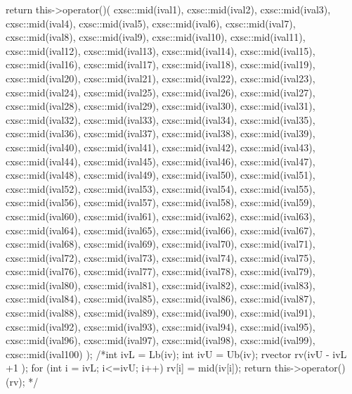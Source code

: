 \begin{DoxyCode}
{
  return this->operator()(
    cxsc::mid(ival1),
    cxsc::mid(ival2),
    cxsc::mid(ival3),
    cxsc::mid(ival4),
    cxsc::mid(ival5),
    cxsc::mid(ival6),
    cxsc::mid(ival7),
    cxsc::mid(ival8),
    cxsc::mid(ival9),
    cxsc::mid(ival10),
    cxsc::mid(ival11),
    cxsc::mid(ival12),
    cxsc::mid(ival13),
    cxsc::mid(ival14),
    cxsc::mid(ival15),
    cxsc::mid(ival16),
    cxsc::mid(ival17),
    cxsc::mid(ival18),
    cxsc::mid(ival19),
    cxsc::mid(ival20),
    cxsc::mid(ival21),
    cxsc::mid(ival22),
    cxsc::mid(ival23),
    cxsc::mid(ival24),
    cxsc::mid(ival25),
    cxsc::mid(ival26),
    cxsc::mid(ival27),
    cxsc::mid(ival28),
    cxsc::mid(ival29),
    cxsc::mid(ival30),
    cxsc::mid(ival31),
    cxsc::mid(ival32),
    cxsc::mid(ival33),
    cxsc::mid(ival34),
    cxsc::mid(ival35),
    cxsc::mid(ival36),
    cxsc::mid(ival37),
    cxsc::mid(ival38),
    cxsc::mid(ival39),
    cxsc::mid(ival40),
    cxsc::mid(ival41),
    cxsc::mid(ival42),
    cxsc::mid(ival43),
    cxsc::mid(ival44),
    cxsc::mid(ival45),
    cxsc::mid(ival46),
    cxsc::mid(ival47),
    cxsc::mid(ival48),
    cxsc::mid(ival49),
    cxsc::mid(ival50),
    cxsc::mid(ival51),
    cxsc::mid(ival52),
    cxsc::mid(ival53),
    cxsc::mid(ival54),
    cxsc::mid(ival55),
    cxsc::mid(ival56),
    cxsc::mid(ival57),
    cxsc::mid(ival58),
    cxsc::mid(ival59),
    cxsc::mid(ival60),
    cxsc::mid(ival61),
    cxsc::mid(ival62),
    cxsc::mid(ival63),
    cxsc::mid(ival64),
    cxsc::mid(ival65),
    cxsc::mid(ival66),
    cxsc::mid(ival67),
    cxsc::mid(ival68),
    cxsc::mid(ival69),
    cxsc::mid(ival70),
    cxsc::mid(ival71),
    cxsc::mid(ival72),
    cxsc::mid(ival73),
    cxsc::mid(ival74),
    cxsc::mid(ival75),
    cxsc::mid(ival76),
    cxsc::mid(ival77),
    cxsc::mid(ival78),
    cxsc::mid(ival79),
    cxsc::mid(ival80),
    cxsc::mid(ival81),
    cxsc::mid(ival82),
    cxsc::mid(ival83),
    cxsc::mid(ival84),
    cxsc::mid(ival85),
    cxsc::mid(ival86),
    cxsc::mid(ival87),
    cxsc::mid(ival88),
    cxsc::mid(ival89),
    cxsc::mid(ival90),
    cxsc::mid(ival91),
    cxsc::mid(ival92),
    cxsc::mid(ival93),
    cxsc::mid(ival94),
    cxsc::mid(ival95),
    cxsc::mid(ival96),
    cxsc::mid(ival97),
    cxsc::mid(ival98),
    cxsc::mid(ival99),
    cxsc::mid(ival100)
    );
  /*int ivL = Lb(iv);
  int ivU = Ub(iv);
  rvector rv(ivU - ivL +1 );
  for (int i = ivL; i<=ivU; i++) {
    rv[i] = mid(iv[i]);
  }
  return this->operator()(rv);
  */
}
\end{DoxyCode}
